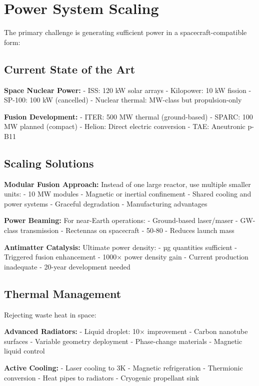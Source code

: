 \documentclass[12pt,letterpaper]{book}
\theoremstyle{definition}
\theoremstyle{plain}
\theoremstyle{remark}
\begin{document}
{{{{{\section{Power System Scaling}

The primary challenge is generating sufficient power in a spacecraft-compatible form:

\subsection{Current State of the Art}

\textbf{Space Nuclear Power:}
- ISS: 120 kW solar arrays
- Kilopower: 10 kW fission
- SP-100: 100 kW (cancelled)
- Nuclear thermal: MW-class but propulsion-only

\textbf{Fusion Development:}
- ITER: 500 MW thermal (ground-based)
- SPARC: 100 MW planned (compact)
- Helion: Direct electric conversion
- TAE: Aneutronic p-B11

\subsection{Scaling Solutions}

\textbf{Modular Fusion Approach:}
Instead of one large reactor, use multiple smaller units:
- 10 MW modules
- Magnetic or inertial confinement
- Shared cooling and power systems
- Graceful degradation
- Manufacturing advantages

\textbf{Power Beaming:}
For near-Earth operations:
- Ground-based laser/maser
- GW-class transmission
- Rectennas on spacecraft
- 50-80%
- Reduces launch mass

\textbf{Antimatter Catalysis:}
Ultimate power density:
- µg quantities sufficient
- Triggered fusion enhancement
- 1000× power density gain
- Current production inadequate
- 20-year development needed

\subsection{Thermal Management}

Rejecting waste heat in space:

\textbf{Advanced Radiators:}
- Liquid droplet: 10× improvement
- Carbon nanotube surfaces
- Variable geometry deployment
- Phase-change materials
- Magnetic liquid control

\textbf{Active Cooling:}
- Laser cooling to 3K
- Magnetic refrigeration
- Thermionic conversion
- Heat pipes to radiators
- Cryogenic propellant sink

}}}}}
\end{document}
